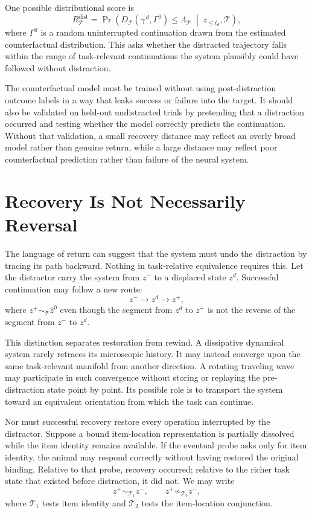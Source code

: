 \documentclass[11pt]{book}
\begin{document}
One possible distributional score is
\[
R_{\mathcal T}^{\mathrm{dist}}
=
\Pr\!\left(
D_{\mathcal T}
\!\left(
\gamma^{\,d},
\Gamma^{0}
\right)
\leq\Lambda_{\mathcal T}
\;\middle|\;
z_{\leq t_d},\mathcal T
\right),
\]
where $\Gamma^{0}$ is a random uninterrupted continuation drawn from the estimated counterfactual distribution. This asks whether the distracted trajectory falls within the range of task-relevant continuations the system plausibly could have followed without distraction.

The counterfactual model must be trained without using post-distraction outcome labels in a way that leaks success or failure into the target. It should also be validated on held-out undistracted trials by pretending that a distraction occurred and testing whether the model correctly predicts the continuation. Without that validation, a small recovery distance may reflect an overly broad model rather than genuine return, while a large distance may reflect poor counterfactual prediction rather than failure of the neural system.

\section*{Recovery Is Not Necessarily Reversal}

The language of return can suggest that the system must undo the distraction by tracing its path backward. Nothing in task-relative equivalence requires this. Let the distractor carry the system from $z^{-}$ to a displaced state $z^{d}$. Successful continuation may follow a new route:
\[
z^{-}
\longrightarrow
z^{d}
\longrightarrow
z^{+},
\]
where $z^{+}\sim_{\mathcal T}\widehat z^{0}$ even though the segment from $z^{d}$ to $z^{+}$ is not the reverse of the segment from $z^{-}$ to $z^{d}$.

This distinction separates restoration from rewind. A dissipative dynamical system rarely retraces its microscopic history. It may instead converge upon the same task-relevant manifold from another direction. A rotating traveling wave may participate in such convergence without storing or replaying the pre-distraction state point by point. Its possible role is to transport the system toward an equivalent orientation from which the task can continue.

Nor must successful recovery restore every operation interrupted by the distractor. Suppose a bound item-location representation is partially dissolved while the item identity remains available. If the eventual probe asks only for item identity, the animal may respond correctly without having restored the original binding. Relative to that probe, recovery occurred; relative to the richer task state that existed before distraction, it did not. We may write
\[
z^{+}\sim_{\mathcal T_1}z^{-},
\qquad
z^{+}\not\sim_{\mathcal T_2}z^{-},
\]
where $\mathcal T_1$ tests item identity and $\mathcal T_2$ tests the item-location conjunction.
\end{document}

